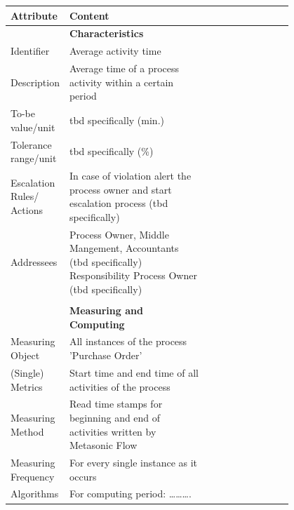 \begin{table}[htbp]
	\footnotesize
	\centering
	\begin{tabular}[t]{@{}l p{0.5\linewidth} p{0.3\linewidth} @{}}
		\toprule
		\textbf{Attribute} & \textbf{Content}  \\
		\midrule
		 & \textbf{Characteristics}
		\\
		Identifier & Average activity time
		\\
		Description & Average time of a process activity within a certain period
		\\
		To-be value/unit & tbd specifically (min.)
		\\
		Tolerance range/unit & tbd specifically (\%)
		\\
		Escalation Rules/ Actions & In case of violation alert the process owner and start escalation process (tbd specifically)
		\\
		Addressees & Process Owner, Middle Mangement, Accountants (tbd specifically)
		Responsibility	Process Owner (tbd specifically)
		\\
		&  &
		\\
		& \textbf{Measuring and Computing}
		\\
		Measuring Object & All instances of the process 'Purchase Order'
		\\
		(Single) Metrics & Start time and end time of all activities of the process
		\\
		Measuring Method & Read time stamps for beginning and end of activities written by Metasonic Flow 
		\\
		Measuring Frequency & For every single instance as it occurs
		\\
		Algorithms & For computing period:     ……….


\end{tabular}
\end{table}
